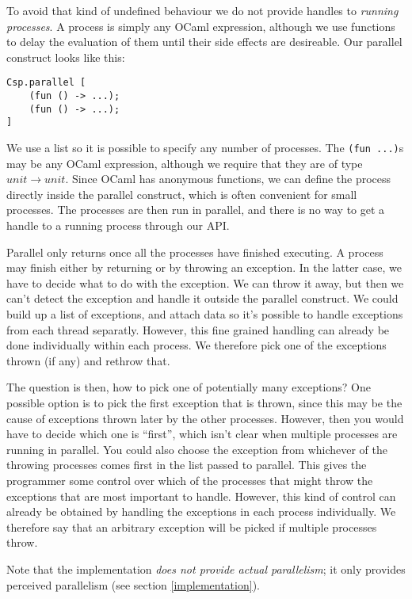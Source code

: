\documentclass[a4paper,12pt]{article}
\begin{document}
To avoid that kind of undefined behaviour we do not provide handles to 
\emph{running processes}.
A process is simply any OCaml expression, although we use functions to delay the 
evaluation of them until their side effects are desireable. 
Our parallel construct looks like this:

\begin{verbatim}
Csp.parallel [
    (fun () -> ...);
    (fun () -> ...);
]
\end{verbatim}

We use a list so it is possible to specify any number of processes. The 
\verb|(fun ...)|s may be any OCaml expression, although we require that they are of type
$unit \to unit$. Since OCaml has anonymous functions, we can define the process directly 
inside the parallel construct, which is often convenient for small processes. The processes
are then run in parallel, and there is no way to get a handle to a running process
through our API.

Parallel only returns once all the processes have finished executing. A process
may finish either by returning or by throwing an exception. In the latter case,
we have to decide what to do with the exception. We can throw it away, but then
we can't detect the exception and handle it outside the parallel construct. We
could build up a list of exceptions, and attach data so it's possible to handle
exceptions from each thread separatly. However, this fine grained handling can
already be done individually within each process. We therefore pick one of the
exceptions thrown (if any) and rethrow that. 

The question is then, how to pick
one of potentially many exceptions? One possible option is to pick the first
exception that is thrown, since this may be the cause of exceptions thrown later
by the other processes. However, then you would have to decide which one is
``first'', which isn't clear when multiple processes are running in parallel.
You could also choose the exception from whichever of the throwing processes
comes first in the list passed to parallel. This gives the programmer some
control over which of the processes that might throw the exceptions that are
most important to handle. However, this kind of control can already be obtained
by handling the exceptions in each process individually. We therefore say that
an arbitrary exception will be picked if multiple processes throw.

Note that the implementation \emph{does not provide actual parallelism}; it only
provides perceived parallelism (see section \ref{implementation}).
\end{document}
